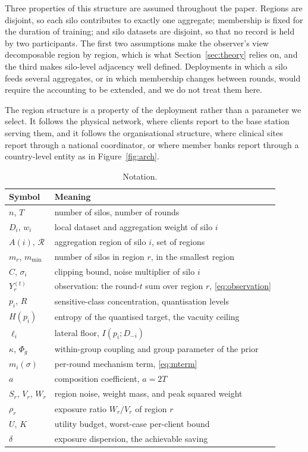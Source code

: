 \documentclass[acmsmall,screen,review,anonymous]{acmart}
\theoremstyle{acmdefinition}%
\newcommand{\Reg}{\mathcal{R}}
\begin{document}
Three properties of this structure are assumed throughout the paper. Regions are
disjoint, so each silo contributes to exactly one aggregate; membership is fixed
for the duration of training; and silo datasets are disjoint, so that no record is
held by two participants. The first two assumptions make the observer's view
decomposable region by region, which is what Section~\ref{sec:theory} relies on,
and the third makes silo-level adjacency well defined. Deployments in which a silo
feeds several aggregates, or in which membership changes between rounds, would
require the accounting to be extended, and we do not treat them here.

The region structure is a property of the deployment rather than a parameter we
select. It follows the physical network, where clients report to the base station
serving them, and it follows the organisational structure, where clinical sites
report through a national coordinator, or where member banks report through a
country-level entity as in Figure~\ref{fig:arch}.

\begin{table}[t]
\caption{Notation.}
\label{tab:notation}
\centering
\footnotesize
\setlength{\tabcolsep}{4pt}
\begin{tabular}{@{}l p{}@{}}
\toprule
Symbol & Meaning \\
\midrule
$n$, $T$            & number of silos, number of rounds \\
$D_i$, $w_i$        & local dataset and aggregation weight of silo $i$ \\
$A(i)$, $\Reg$      & aggregation region of silo $i$, set of regions \\
$m_r$, $m_{\min}$   & number of silos in region $r$, in the smallest region \\
$C$, $\sigma_i$     & clipping bound, noise multiplier of silo $i$ \\
$Y_r^{(t)}$         & observation: the round-$t$ sum over region $r$, \eqref{eq:observation} \\
$p_i$, $R$          & sensitive-class concentration, quantisation levels \\
$H(p_i)$            & entropy of the quantised target, the vacuity ceiling \\
$\ell_i$            & lateral floor, $I(p_i; D_{-i})$ \\
$\kappa$, $\Phi_g$  & within-group coupling and group parameter of the prior \\
$m_i(\sigma)$       & per-round mechanism term, \eqref{eq:mterm} \\
$a$                 & composition coefficient, $a = 2T$ \\
$S_r$, $V_r$, $W_r$ & region noise, weight mass, and peak squared weight \\
$\rho_r$            & exposure ratio $W_r / V_r$ of region $r$ \\
$U$, $K$            & utility budget, worst-case per-client bound \\
$\delta$            & exposure dispersion, the achievable saving \\
\bottomrule
\end{tabular}
\end{table}
\end{document}
